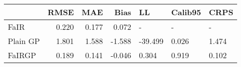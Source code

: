 \begin{tabular}{lrrrlll}
\toprule
{} &   RMSE &    MAE &   Bias &      LL & Calib95 &   CRPS \\
\midrule
FaIR     &  0.220 &  0.177 &  0.072 &       - &       - &      - \\
Plain GP &  1.801 &  1.588 & -1.588 & -39.499 &   0.026 &  1.474 \\
FaIRGP   &  0.189 &  0.141 & -0.046 &   0.304 &   0.919 &  0.102 \\
\bottomrule
\end{tabular}
